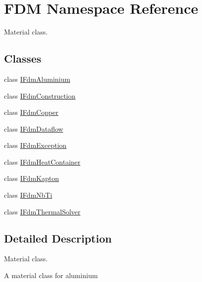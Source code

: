 \hypertarget{namespace_f_d_m}{}\section{F\+D\+M Namespace Reference}
\label{namespace_f_d_m}


Material class.  


\subsection*{Classes}
\begin{DoxyCompactItemize}
\item 
class \hyperlink{class_f_d_m_1_1_i_fdm_aluminium}{I\+Fdm\+Aluminium}
\item 
class \hyperlink{class_f_d_m_1_1_i_fdm_construction}{I\+Fdm\+Construction}
\item 
class \hyperlink{class_f_d_m_1_1_i_fdm_copper}{I\+Fdm\+Copper}
\item 
class \hyperlink{class_f_d_m_1_1_i_fdm_dataflow}{I\+Fdm\+Dataflow}
\item 
class \hyperlink{class_f_d_m_1_1_i_fdm_exception}{I\+Fdm\+Exception}
\item 
class \hyperlink{class_f_d_m_1_1_i_fdm_heat_container}{I\+Fdm\+Heat\+Container}
\item 
class \hyperlink{class_f_d_m_1_1_i_fdm_kapton}{I\+Fdm\+Kapton}
\item 
class \hyperlink{class_f_d_m_1_1_i_fdm_nb_ti}{I\+Fdm\+Nb\+Ti}
\item 
class \hyperlink{class_f_d_m_1_1_i_fdm_thermal_solver}{I\+Fdm\+Thermal\+Solver}
\end{DoxyCompactItemize}


\subsection{Detailed Description}
Material class. 

A material class for aluminium 